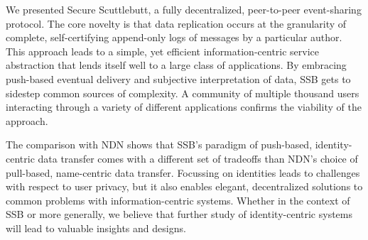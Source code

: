 \documentclass[9pt,sigconf]{acmart}
\begin{document}
We presented Secure Scuttlebutt, a fully decentralized, peer-to-peer event-sharing protocol. The core novelty is that data replication occurs at the granularity of complete, self-certifying append-only logs of messages by a particular author. This approach leads to a simple, yet efficient information-centric service abstraction that lends itself well to a large class of applications. By embracing push-based eventual delivery and subjective interpretation of data, SSB gets to sidestep common sources of complexity. A community of multiple thousand users interacting through a variety of different applications confirms the viability of the approach.

The comparison with NDN shows that SSB's paradigm of push-based, identity-centric data transfer comes with a different set of tradeoffs than NDN's choice of pull-based, name-centric data transfer. Focussing on identities leads to challenges with respect to user privacy, but it also enables elegant, decentralized solutions to common problems with information-centric systems. Whether in the context of SSB or more generally, we believe that further study of identity-centric systems will lead to valuable insights and designs.



\end{document}
